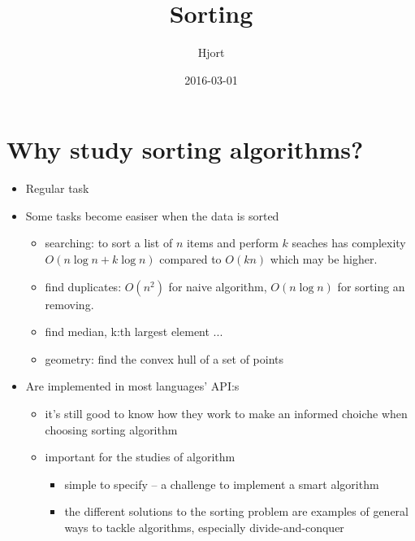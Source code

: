\documentclass{article}
\title{Sorting}
\date{2016-03-01}
\author{Hjort}
\begin{document}
\maketitle

\section{Why study sorting algorithms?}

\begin{itemize}
    \item Regular task
    \item Some tasks become easiser when the data is sorted
        \begin{itemize}
            \item searching: to sort a list of $n$ items and perform $k$ seaches has complexity $O(n \log n + k \log n)$ compared to $O(kn)$ which may be higher.
            \item find duplicates: $O(n^2)$ for naive algorithm, $O(n\log n)$ for sorting an removing.
            \item find median, k:th largest element ...
            \item geometry: find the convex hull of a set of points
        \end{itemize}
    \item Are implemented in most languages' API:s
        \begin{itemize}
            \item it's still good to know how they work to make an informed choiche when choosing sorting algorithm
            \item important for the studies of algorithm
                \begin{itemize}
                    \item simple to specify – a challenge to implement a smart algorithm
                    \item the different solutions to the sorting problem are examples of general ways to tackle algorithms, especially divide-and-conquer
                \end{itemize}
        \end{itemize}
\end{itemize}
\end{document}
